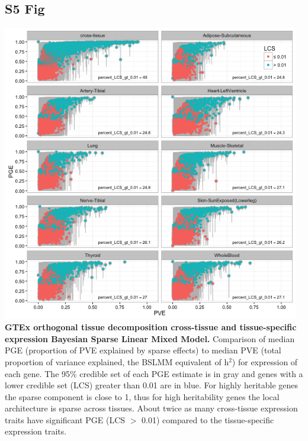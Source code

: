 \documentclass[10pt,letterpaper]{article}
\begin{document}
\begin{singlespace}
\subsection*{S5 Fig}
\includegraphics[width=13cm]{Figures/GenArch_Supp/S5Fig.png}
\label{S5_Fig}
{\bf GTEx orthogonal tissue decomposition cross-tissue and tissue-specific expression Bayesian Sparse Linear Mixed Model.} Comparison of median PGE (proportion of PVE explained by sparse effects) to median PVE (total proportion of variance explained, the BSLMM equivalent of h$^2$) for expression of each gene. The 95\% credible set of each PGE estimate is in gray and genes with a lower credible set (LCS) greater than 0.01 are in blue. For highly heritable genes the sparse component is close to 1, thus for high heritability genes the local architecture is sparse across tissues. About twice as many cross-tissue expression traits have significant PGE (LCS $>$ 0.01) compared to the tissue-specific expression traits.


\end{singlespace}
\end{document}
